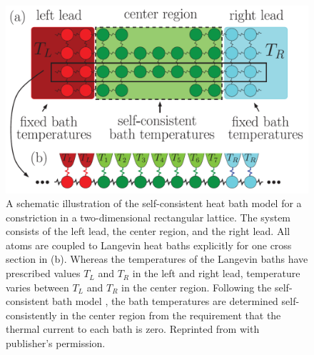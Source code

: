 
\begin{figure}
\begin{center}
 \includegraphics[width=.99\columnwidth]{pics/schb_setup.pdf}
 \caption{A schematic illustration of the self-consistent heat bath model for a constriction in a two-dimensional rectangular lattice. The system consists of the left lead, the center region, and the right lead. All atoms are coupled to Langevin heat baths explicitly for one cross section in (b). Whereas the temperatures of the Langevin baths have prescribed values $T_L$ and $T_R$ in the left and right lead, temperature varies between $T_L$ and $T_R$ in the center region. Following the self-consistent bath model \cite{bolsterli70}, the bath temperatures are determined self-consistently in the center region from the requirement that the thermal current to each bath is zero. Reprinted from  with publisher's permission.}
\label{fig:schb_setup}
\end{center}
\end{figure} 

